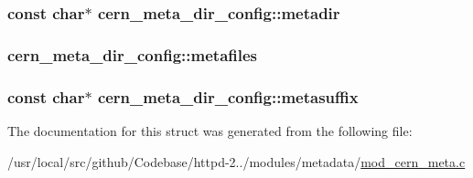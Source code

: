 \subsubsection[{\texorpdfstring{metadir}{metadir}}]{\setlength{\rightskip}{0pt plus 5cm}const char$\ast$ cern\+\_\+meta\+\_\+dir\+\_\+config\+::metadir}\hypertarget{structcern__meta__dir__config_a02effbe56095a73074becf6f3806e9b2}{}\label{structcern__meta__dir__config_a02effbe56095a73074becf6f3806e9b2}
\subsubsection[{\texorpdfstring{metafiles}{metafiles}}]{ cern\+\_\+meta\+\_\+dir\+\_\+config\+::metafiles}\hypertarget{structcern__meta__dir__config_a3ad2e7b71b4539b2d7d1f3ae20569400}{}\label{structcern__meta__dir__config_a3ad2e7b71b4539b2d7d1f3ae20569400}
\subsubsection[{\texorpdfstring{metasuffix}{metasuffix}}]{\setlength{\rightskip}{0pt plus 5cm}const char$\ast$ cern\+\_\+meta\+\_\+dir\+\_\+config\+::metasuffix}\hypertarget{structcern__meta__dir__config_aa81f342b78435b814b3484213deae315}{}\label{structcern__meta__dir__config_aa81f342b78435b814b3484213deae315}


The documentation for this struct was generated from the following file\+:\begin{DoxyCompactItemize}
\item 
/usr/local/src/github/\+Codebase/httpd-\/2../modules/metadata/\hyperlink{mod__cern__meta_8c}{mod\+\_\+cern\+\_\+meta.\+c}\end{DoxyCompactItemize}
